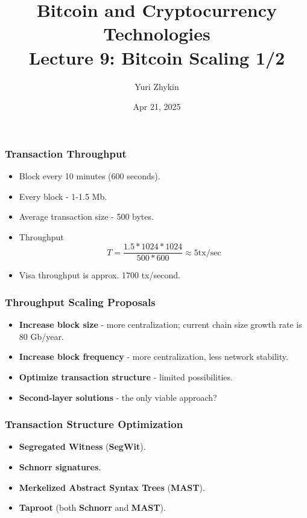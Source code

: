 \documentclass{beamer}
\title{
  Bitcoin and Cryptocurrency Technologies \\
  Lecture 9: Bitcoin Scaling 1/2
}
\author{Yuri Zhykin}
\date{Apr 21, 2025}
\begin{document}
\frame{\titlepage}

\begin{frame}
  \frametitle{Transaction Throughput}
  \begin{itemize}
  \item Block every 10 minutes (600 seconds).
  \item Every block - 1-1.5 Mb.
  \item Average transaction size - 500 bytes.
  \item Throughput
    $$T = \frac{1.5 * 1024 * 1024}{500 * 600} \approx 5 \text{tx/sec}$$
  \item Visa throughput is approx. 1700 tx/second.
  \end{itemize}
\end{frame}

\begin{frame}
  \frametitle{Throughput Scaling Proposals}
  \begin{itemize}
  \item \textbf{Increase block size} - more centralization; current chain size
    growth rate is 80 Gb/year.
  \item \textbf{Increase block frequency} - more centralization, less network
    stability.
  \item \textbf{Optimize transaction structure} - limited possibilities.
  \item \textbf{Second-layer solutions} - the only viable approach?
  \end{itemize}
\end{frame}

\begin{frame}
  \frametitle{Transaction Structure Optimization}
  \begin{itemize}
  \item \textbf{Segregated Witness} (\textbf{SegWit}).
  \item \textbf{Schnorr signatures}.
  \item \textbf{Merkelized Abstract Syntax Trees} (\textbf{MAST}).
  \item \textbf{Taproot} (both \textbf{Schnorr} and \textbf{MAST}).
  \end{itemize}
\end{frame}
\end{document}
